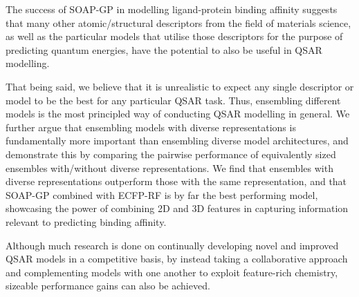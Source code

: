 

The success of SOAP-GP in modelling ligand-protein binding affinity suggests that many other atomic/structural descriptors from the field of materials science, as well as the particular models that utilise those descriptors for the purpose of predicting quantum energies, have the potential to also be useful in QSAR modelling.

That being said, we believe that it is unrealistic to expect any single descriptor or model to be the best for any particular QSAR task. Thus, ensembling different models is the most principled way of conducting QSAR modelling in general. We further argue that ensembling models with diverse representations is fundamentally more important than ensembling diverse model architectures, and  demonstrate this by comparing the pairwise performance of equivalently sized ensembles with/without diverse representations. We find that ensembles with diverse representations outperform those with the same representation, and that SOAP-GP combined with ECFP-RF is by far the best performing model, showcasing the power of combining 2D and 3D features in capturing information relevant to predicting binding affinity.

Although much research is done on continually developing novel and improved QSAR models in a competitive basis, by instead taking a collaborative approach and complementing models with one another to exploit feature-rich chemistry, sizeable performance gains can also be achieved.

\renewcommand{\arraystretch}{1.0}